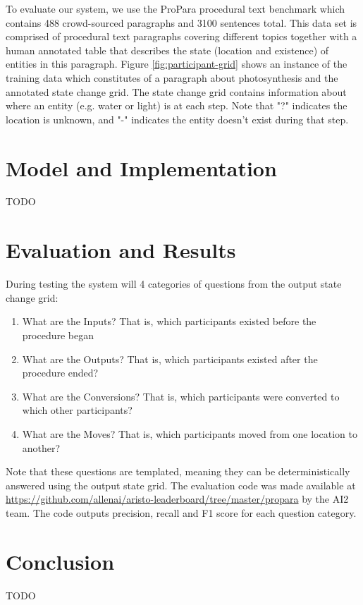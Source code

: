 \documentclass[11pt,a4paper]{article}
\begin{document}
To evaluate our system, we use the ProPara procedural text benchmark 
which contains 488 crowd-sourced paragraphs and 3100 sentences total. 
This data set is comprised of procedural text paragraphs covering different 
topics together with a human annotated table that describes the state 
(location and existence) of entities in this paragraph. Figure 
\ref{fig:participant-grid} shows an instance of the training data which 
constitutes of a paragraph about photosynthesis and the annotated state 
change grid. The state change grid contains information about where an 
entity (e.g. water or light) is at each step. Note that "?" indicates the 
location is unknown, and "-" indicates the entity doesn't exist during that step.

\section{Model and Implementation}

TODO

\section{Evaluation and Results}

During testing the system will 4 categories of questions from the output 
state change grid: 

\begin{enumerate}
  \item What are the Inputs? That is, which participants existed before the 
  	  procedure began
  \item What are the Outputs? That is, which participants existed after 
	  the procedure ended?
  \item What are the Conversions? That is, which participants were 
  	  converted to which other participants?
  \item What are the Moves? That is, which participants 
	   moved from one location to another?
\end{enumerate}

Note that these questions are templated, meaning they can be deterministically 
answered using the output state grid. The evaluation code was made available 
at \url{https://github.com/allenai/aristo-leaderboard/tree/master/propara} by 
the AI2 team. The code outputs precision, recall and F1 score for each 
question category.

\section{Conclusion}

TODO



\end{document}

